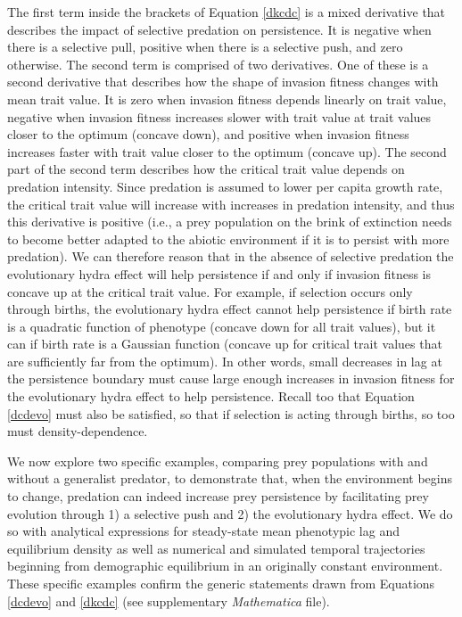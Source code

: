 \documentclass[11pt]{article}
\begin{document}
The first term inside the brackets of Equation \eqref{dkcdc}  is a mixed derivative that describes the impact of selective predation on persistence.
It is negative when there is a selective pull, positive when there is a selective push, and zero otherwise.
The second term is comprised of two derivatives.
One of these is a second derivative that describes how the shape of invasion fitness changes with mean trait value.
It is zero when invasion fitness depends linearly on trait value, negative when invasion fitness increases slower with trait value at trait values closer to the optimum (concave down), and positive when invasion fitness increases faster with trait value closer to the optimum (concave up).
The second part of the second term describes how the critical trait value depends on predation intensity. 
Since predation is assumed to lower per capita growth rate, the critical trait value will increase with increases in predation intensity, and thus this derivative is positive (i.e., a prey population on the brink of extinction needs to become better adapted to the abiotic environment if it is to persist with more predation).
We can therefore reason that in the absence of selective predation the evolutionary hydra effect will help persistence if and only if invasion fitness is concave up at the critical trait value.
For example, if selection occurs only through births, the evolutionary hydra effect cannot help persistence if birth rate is a quadratic function of phenotype (concave down for all trait values), but it can if birth rate is a Gaussian function (concave up for critical trait values that are sufficiently far from the optimum). 
In other words, small decreases in lag at the persistence boundary must cause large enough increases in invasion fitness for the evolutionary hydra effect to help persistence.
Recall too that Equation \eqref{dcdevo} must also be satisfied, so that if selection is acting through births, so too must density-dependence.

We now explore two specific examples, comparing prey populations with and without a generalist predator, to demonstrate that, when the environment begins to change, predation can indeed increase prey persistence by facilitating prey evolution through 1) a selective push and 2) the evolutionary hydra effect.
We do so with analytical expressions for steady-state mean phenotypic lag and equilibrium density as well as numerical and simulated temporal trajectories beginning from demographic equilibrium in an originally constant environment.
These specific examples confirm the generic statements drawn from Equations \eqref{dcdevo} and \eqref{dkcdc} (see supplementary \textit{Mathematica} file).
\end{document}
